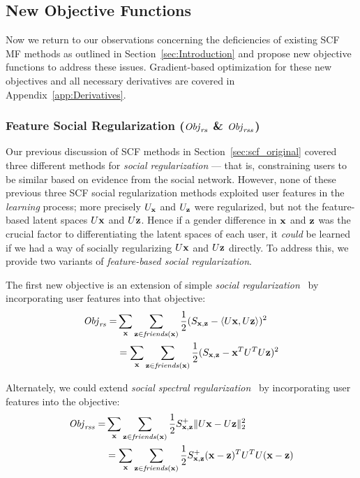 \subsection{New Objective Functions}

\label{sec:newobjfun_defs}

Now we return to our observations concerning the deficiencies of
existing SCF MF methods as outlined in Section~\ref{sec:Introduction}
and propose new objective functions to address these issues.  
Gradient-based optimization for these new objectives and all necessary derivatives 
are covered in Appendix~\ref{app:Derivatives}.

\subsubsection{Feature Social Regularization ($\mathit{Obj}_{\mathit{rs}}$ \& $\mathit{Obj}_{\mathit{rss}}$)}
\label{sec:SocRec}

Our previous discussion of SCF methods in Section~\ref{sec:scf_original}
covered three different methods for \emph{social regularization} --- that is,
constraining users to be similar based on evidence from the social network.
However, none of these previous three SCF social regularization methods
exploited user features in the \emph{learning} process; more precisely 
$U_{\mathbf{x}}$ and $U_{\mathbf{z}}$ were regularized, but not the feature-based latent
spaces $U\mathbf{x}$ and $U\mathbf{z}$.  Hence if a gender difference in $\mathbf{x}$ and $\mathbf{z}$ was the
crucial factor to differentiating the latent spaces of each user, it \emph{could} 
be learned if we had a way of socially regularizing $U\mathbf{x}$ and $U\mathbf{z}$
directly.  To address this, we provide two variants of 
\emph{feature-based social regularization}.

The first new objective is an extension of simple 
\emph{social regularization}~\cite{lla,socinf} by incorporating user
features into that objective:
\begin{align}
\mathit{Obj}_{\mathit{rs}} = & \sum_{\mathbf{x}} \sum_{\mathbf{z} \in \mathit{friends}(\mathbf{x})} \frac{1}{2} (S_{\mathbf{x},\mathbf{z}} - \langle U\mathbf{x}, U\mathbf{z} \rangle)^2 \\
& = \sum_{\mathbf{x}} \sum_{\mathbf{z} \in \mathit{friends}(\mathbf{x})} \frac{1}{2} (S_{\mathbf{x},\mathbf{z}} - \mathbf{x}^T U^T U \mathbf{z})^2 \nonumber 
\end{align}


Alternately, we could extend \emph{social spectral
regularization}~\cite{sr,rrmf} by incorporating user features into the
objective:
\begin{align}
\mathit{Obj}_{\mathit{rss}} = & \sum_{\mathbf{x}} \sum_{\mathbf{z} \in \mathit{friends}(\mathbf{x})} \frac{1}{2} S^+_{\mathbf{x},\mathbf{z}} \| U\mathbf{x} - U\mathbf{z} \|_2^2 \\
& = \sum_{\mathbf{x}} \sum_{\mathbf{z} \in \mathit{friends}(\mathbf{x})} \frac{1}{2} S^+_{\mathbf{x},\mathbf{z}} (\mathbf{x} - \mathbf{z})^T U^T U (\mathbf{x} - \mathbf{z}) \nonumber
\end{align}

